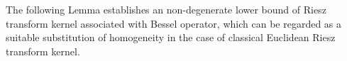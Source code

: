 \documentclass[12pt]{amsart}
\begin{document}
%
%
%
The following Lemma establishes an non-degenerate lower bound of Riesz transform kernel associated with Bessel operator, which can be regarded as a suitable substitution of homogeneity in the case of classical Euclidean Riesz transform kernel.
\end{document}
